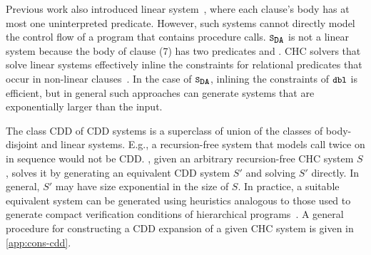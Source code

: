 Previous work also introduced linear system~\cite{albarghouthi12a},
where each clause's body has at most one uninterpreted predicate.
%
However, such systems cannot directly model the control flow of a
program that contains procedure calls.
%
$\mcchc$ is not a linear system because the body of clause (7) has two
predicates  and .
%
CHC solvers that solve linear systems effectively inline the
constraints for relational predicates that occur in non-linear
clauses~\cite{albarghouthi12b}.
%
In the case of $\mcchc$, inlining the constraints of $\cc{dbl}$ is
efficient, but in general such approaches can generate systems that
are exponentially larger than the input.

\begin{figure}[t]
  \centering
  \begin{floatrow}[2]
      {}
      {}
  \end{floatrow}
\end{figure}

The class CDD of CDD systems is a superclass of union of the classes of
body-disjoint and linear systems.
%
%
E.g., a recursion-free system that models  
call  twice on  in sequence would not
be CDD.
%
\sys, given an arbitrary recursion-free CHC system $S$,
solves it by generating an equivalent CDD system $S'$ and
solving $S'$ directly.
%
In general, $S'$ may have size exponential in the size of
$S$.
%
In practice, a suitable equivalent system can be generated using
heuristics analogous to those used to generate compact verification
conditions of hierarchical programs~\cite{flanagan01,lal-qadeer15}.
%
A general procedure for constructing a CDD expansion of a given CHC
system is given in \autoref{app:cons-cdd}.

